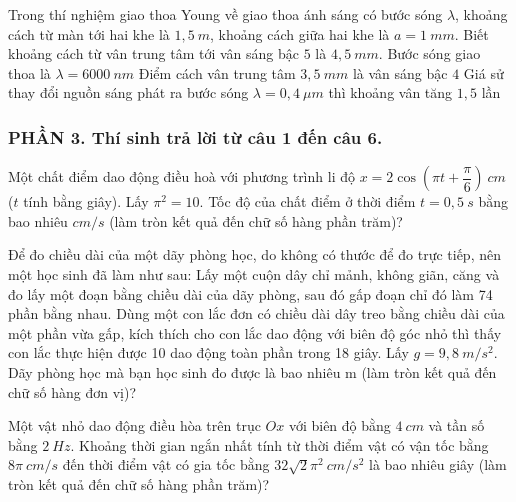 \begin{ex}
	Trong thí nghiệm giao thoa Young về giao thoa ánh sáng có bước sóng $\lambda$, khoảng cách từ màn tới hai khe là $1,5 \ m$, khoảng cách giữa hai khe là $a=1 \ mm$. Biết khoảng cách từ vân trung tâm tới vân sáng bậc $5$ là $4,5 \ mm$.
	{Bước sóng giao thoa là $\lambda=6000\ nm$}
	{Điểm cách vân trung tâm $3,5 \ mm$ là vân sáng bậc $4$}
	{Giá sử thay đổi nguồn sáng phát ra bước sóng $\lambda=0,4\ \mu m$ thì khoảng vân tăng $1,5$ lần}
\end{ex}
\subsubsection*{PHẦN 3. Thí sinh trả lời từ câu 1 đến câu 6.}
\setcounter{ex}{0}
\begin{ex}
	Một chất điểm dao động điều hoà với phương trình li độ $x=2 \cos \left(\pi t+\dfrac{\pi}{6}\right)\ cm$ ($t$ tính bằng giây). Lấy $\pi^2=10$. Tốc độ của chất điểm ở thời điểm $t=0,5 \ s$ bằng bao nhiêu $cm/s$ (làm tròn kết quả đến chữ số hàng phần trăm)?
\end{ex}
\begin{ex}
	Để đo chiều dài của một dãy phòng học, do không có thước để đo trực tiếp, nên một học sinh đã làm như sau: Lấy một cuộn dây chỉ mảnh, không giãn, căng và đo lấy một đoạn bằng chiều dài của dãy phòng, sau đó gấp đoạn chỉ đó làm 74 phần bằng nhau. Dùng một con lắc đơn có chiều dài dây treo bằng chiều dài của một phần vừa gấp, kích thích cho con lắc dao động với biên độ góc nhỏ thì thấy con lắc thực hiện được 10 dao động toàn phần trong 18 giây. Lấy $g=9,8\ m/s^2$. Dãy phòng học mà bạn học sinh đo được là bao nhiêu m (làm tròn kết quả đến chữ số hàng đơn vị)? 
	
	
\end{ex}
\begin{ex}
	Một vật nhỏ dao động điều hòa trên trục $Ox$ với biên độ bằng $4 \ cm$ và tần số bằng $2 \ Hz$. Khoảng thời gian ngắn nhất tính từ thời điểm vật có vận tốc bằng $8 \pi\ cm/s$ đến thời điểm vật có gia tốc bằng $32 \sqrt{2} \pi^2\ cm/s^2$ là bao nhiêu giây (làm tròn kết quả đến chữ số hàng phần trăm)?
\end{ex}
